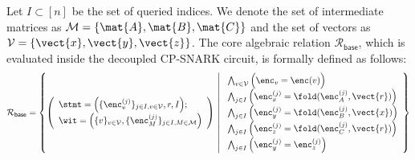 Let $I \subset [n]$ be the set of queried indices. We denote the set of intermediate matrices as $\mathcal{M} = \{\mat{A}, \mat{B}, \mat{C}\}$ and the set of vectors as $\mathcal{V} = \{\vect{x}, \vect{y}, \vect{z}\}$. The core algebraic relation $\mathcal{R}_{\mathsf{base}}$, which is evaluated inside the decoupled CP-SNARK circuit, is formally defined as follows:
\[
\mathcal{R}_{\mathsf{base}} = \left\{
\left( 
\begin{array}{l}
\stmt = \Big( \{ \enc_{v}^{(j)} \}_{j \in I, v \in \mathcal{V}}, r, I \Big) ; 
\\
\wit = \Big( \{ v \}_{v \in \mathcal{V}},  \{ \enc_{M}^{(j)} \}_{j \in I, M \in \mathcal{M}} \Big)
\end{array}
\right)
\ \middle\vert \
\begin{array}{l}
\bigwedge_{v \in \mathcal{V}} \Big( \enc_v = \enc(v) \Big) 
\\
\bigwedge_{j \in I} \left( \enc_x^{(j)} = \fold(\enc_A^{(j)},\vect{r}) \right) 
\\
\bigwedge_{j \in I} \left( \enc_y^{(j)} = \fold(\enc_B^{(j)},\vect{x}) \right)
\\
\bigwedge_{j \in I} \left( \enc_z^{(j)} = \fold(\enc_C^{(j)},\vect{r}) \right)
\\
\bigwedge_{j \in I} \Big( \enc_y^{(j)} = \enc_z^{(j)} \Big)
\end{array}
\right\}
\]



